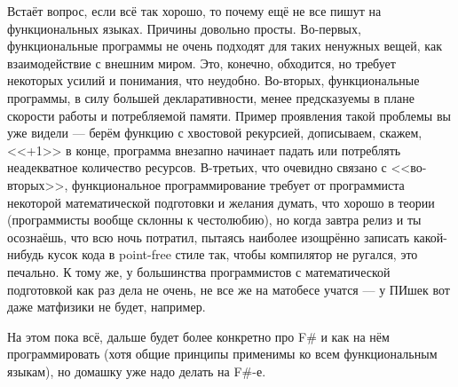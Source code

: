 \documentclass[a5paper]{article}
\begin{document}
Встаёт вопрос, если всё так хорошо, то почему ещё не все пишут на функциональных языках. Причины довольно просты. Во-первых, функциональные программы не очень подходят для таких ненужных вещей, как взаимодействие с внешним миром. Это, конечно, обходится, но требует некоторых усилий и понимания, что неудобно. Во-вторых, функциональные программы, в силу большей декларативности, менее предсказуемы в плане скорости работы и потребляемой памяти. Пример проявления такой проблемы вы уже видели --- берём функцию с хвостовой рекурсией, дописываем, скажем, <<+1>> в конце, программа внезапно начинает падать или потреблять неадекватное количество ресурсов. В-третьих, что очевидно связано с <<во-вторых>>, функциональное программирование требует от программиста некоторой математической подготовки и желания думать, что хорошо в теории (программисты вообще склонны к честолюбию), но когда завтра релиз и ты осознаёшь, что всю ночь потратил, пытаясь наиболее изощрённо записать какой-нибудь кусок кода в point-free стиле так, чтобы компилятор не ругался, это печально. К тому же, у большинства программистов с математической подготовкой как раз дела не очень, не все же на матобесе учатся --- у ПИшек вот даже матфизики не будет, например.

На этом пока всё, дальше будет более конкретно про F\# и как на нём программировать (хотя общие принципы применимы ко всем функциональным языкам), но домашку уже надо делать на F\#-е.
\end{document}
